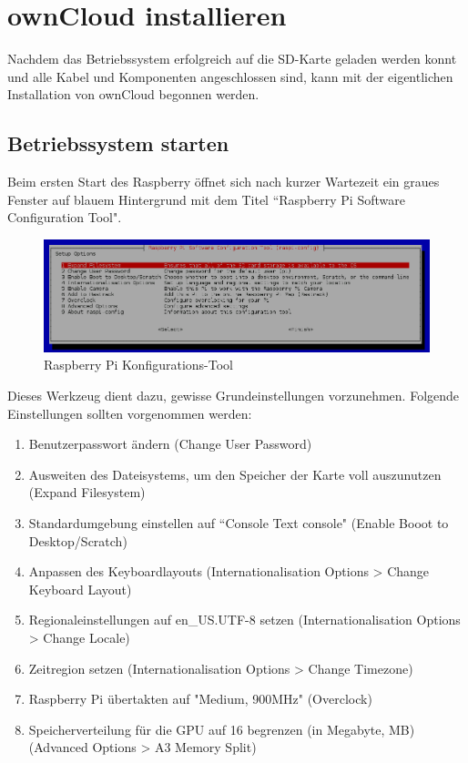 \section{ownCloud installieren}
Nachdem das Betriebssystem erfolgreich auf die SD-Karte geladen werden konnt und alle Kabel und Komponenten angeschlossen sind, kann mit der eigentlichen Installation von ownCloud begonnen werden.

\subsection{Betriebssystem starten}
Beim ersten Start des Raspberry öffnet sich nach kurzer Wartezeit ein graues Fenster auf blauem Hintergrund mit dem Titel ``Raspberry Pi Software Configuration Tool". 

\begin{figure}[h]
\centering
\includegraphics[scale=0.5]{images/raspiconfig}
\caption{Raspberry Pi Konfigurations-Tool}
\end{figure}

Dieses Werkzeug dient dazu, gewisse Grundeinstellungen vorzunehmen. Folgende Einstellungen sollten vorgenommen werden: 

\begin{enumerate}
\item Benutzerpasswort ändern (Change User Password)
\item Ausweiten des Dateisystems, um den Speicher der Karte voll auszunutzen (Expand Filesystem)
\item Standardumgebung einstellen auf ``Console Text console" (Enable Booot to Desktop/Scratch)
\item Anpassen des Keyboardlayouts (Internationalisation Options > Change Keyboard Layout)
\item Regionaleinstellungen auf en\_US.UTF-8 setzen (Internationalisation Options > Change Locale)
\item Zeitregion setzen (Internationalisation Options > Change Timezone) 
\item Raspberry Pi übertakten auf "Medium, 900MHz" (Overclock)
\item Speicherverteilung für die GPU auf 16 begrenzen (in Megabyte, MB) (Advanced Options > A3 Memory Split)
\end{enumerate}

